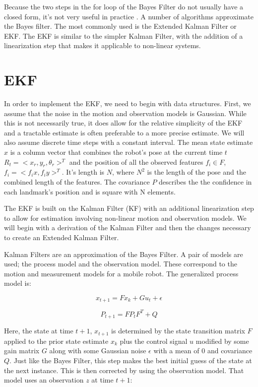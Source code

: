 \documentclass[12pt]{report}
\begin{document}
Because the two steps in the for loop of the Bayes Filter do not
usually have a closed form, it's not very useful in practice
\cite{ThrunPR}. A number of algorithms approximate the Bayes filter.
The most commonly used is the Extended Kalman Filter or EKF. The EKF
is similar to the simpler Kalman Filter, with the addition of a
linearization step that makes it applicable to non-linear systems.

\section{EKF}  
In order to implement the EKF, we need to begin with data structures.
First, we assume that the noise in the motion and observation models
is Gaussian. While this is not necessarily true, it does allow for the
relative simplicity of the EKF and a tractable estimate is often
preferable to a more precise estimate. We will also assume discrete
time steps with a constant interval. The mean state estimate $x$ is a
column vector that combines the robot's pose at the current time $t$
$R_t = <x_r, y_r, \theta_r>^T$ and the position of all the observed
features $f_i \in F$, $f_i = <f_ix, f_iy>^T$. It's length is $N$,
where $N^2$ is the length of the pose and the combined length of the
features. The covariance $P$ describes the the confidence in each
landmark's position and is square with N elements.

The EKF is built on the Kalman Filter (KF) with an additional
linearization step to allow for estimation involving non-linear motion
and observation models. We will begin with a derivation of the Kalman
Filter and then the changes necessary to create an Extended Kalman
Filter.

Kalman Filters are an approximation of the Bayes Filter. A pair of
models are used; the process model and the observation model. These
correspond to the motion and measurement models for a mobile robot.
The generalized process model is:

\begin{equation}\label{kf_process_mean}
x_{t+1} = Fx_k + Gu_t + \epsilon
\end{equation}

\begin{equation}\label{kf_process_cov}
P_{t+1} = FP_tF^T + Q
\end{equation}

Here, the state at time $t+1$, $x_{t+1}$ is determined by the state
transition matrix $F$ applied to the prior state estimate $x_k$ plus
the control signal $u$ modified by some gain matrix $G$ along with
some Gaussian noise $\epsilon$ with a mean of 0 and covariance $Q$.
Just like the Bayes Filter, this step makes the best initial guess of
the state at the next instance. This is then corrected by using the
observation model. That model uses an observation $z$ at time $t+1$:
\end{document}
